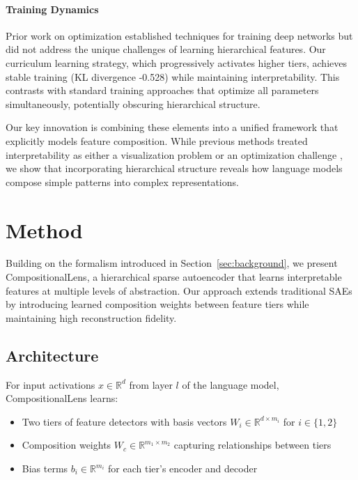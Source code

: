 \documentclass{article} %
\begin{document}
\paragraph{Training Dynamics} Prior work on optimization \cite{kingma2014adam, ba2016layer} established techniques for training deep networks but did not address the unique challenges of learning hierarchical features. Our curriculum learning strategy, which progressively activates higher tiers, achieves stable training (KL divergence -0.528) while maintaining interpretability. This contrasts with standard training approaches that optimize all parameters simultaneously, potentially obscuring hierarchical structure.

Our key innovation is combining these elements into a unified framework that explicitly models feature composition. While previous methods treated interpretability as either a visualization problem \cite{radford2019language} or an optimization challenge \cite{kingma2014adam}, we show that incorporating hierarchical structure reveals how language models compose simple patterns into complex representations.


\section{Method}
\label{sec:method}

Building on the formalism introduced in Section~\ref{sec:background}, we present CompositionalLens, a hierarchical sparse autoencoder that learns interpretable features at multiple levels of abstraction. Our approach extends traditional SAEs by introducing learned composition weights between feature tiers while maintaining high reconstruction fidelity.

\subsection{Architecture}
For input activations $x \in \mathbb{R}^d$ from layer $l$ of the language model, CompositionalLens learns:

\begin{itemize}
    \item Two tiers of feature detectors with basis vectors $W_i \in \mathbb{R}^{d \times m_i}$ for $i \in \{1,2\}$
    \item Composition weights $W_c \in \mathbb{R}^{m_1 \times m_2}$ capturing relationships between tiers
    \item Bias terms $b_i \in \mathbb{R}^{m_i}$ for each tier's encoder and decoder
\end{itemize}
\end{document}
